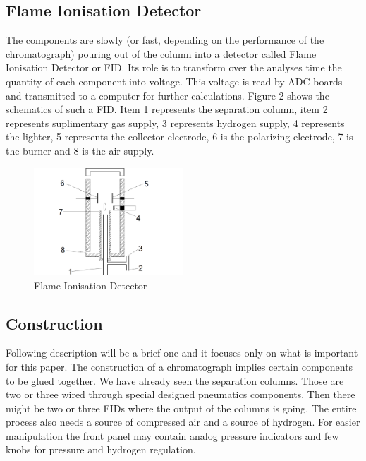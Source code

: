 \documentclass[conference]{IEEEtran}
\begin{document}
\subsection{Flame Ionisation Detector}

    The components are slowly (or fast, depending on the performance of the chromatograph) pouring out of the column
    into a detector called Flame Ionisation Detector or FID. Its role is to transform over the analyses time the quantity
    of each component into voltage. This voltage is read by ADC boards and transmitted to a computer for further calculations.
    Figure 2 shows the schematics of such a FID. Item 1 represents the separation column, item 2 represents suplimentary
    gas supply, 3 represents hydrogen supply, 4 represents the lighter, 5 represents the collector electrode, 6 is the
    polarizing electrode, 7 is the burner and 8 is the air supply.

    \begin{figure}
        \centering
        \includegraphics[width=0.5\textwidth]{fid.png}
        \caption{Flame Ionisation Detector}
    \end{figure}

\subsection{Construction}
    
    Following description will be a brief one and it focuses only on what is important for this paper. The construction of a 
    chromatograph implies certain components to be glued together. We have already seen the separation columns. Those are 
    two or three wired through special designed pneumatics components. Then there might be two or three FIDs where the
    output of the columns is going. The entire process also needs a source of compressed air and a source of hydrogen. For
    easier manipulation the front panel may contain analog pressure indicators and few knobs for pressure and hydrogen
    regulation.
\end{document}
